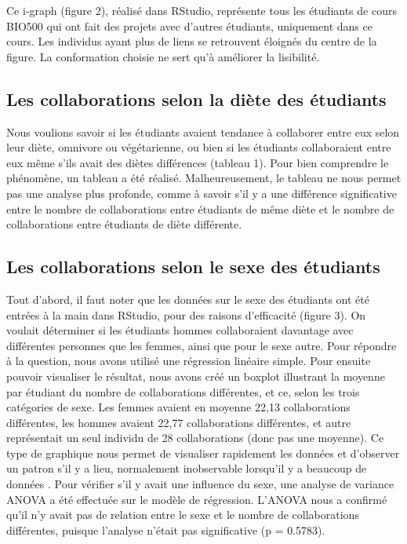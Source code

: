 \documentclass[twoside,twocolumn]{article}
\begin{document}
Ce i-graph (figure 2), réalisé dans RStudio, représente tous les étudiants de cours BIO500 qui ont fait des projets avec d’autres étudiants, uniquement dans ce cours. Les individus ayant plus de liens se retrouvent éloignés du centre de la figure. La conformation choisie ne sert qu’à améliorer la lisibilité.


\subsection{Les collaborations selon la diète des étudiants}

Nous voulions savoir si les étudiants avaient tendance à collaborer entre eux selon leur diète, omnivore ou végétarienne, ou bien si les étudiants collaboraient entre eux même s’ils avait des diètes différences (tableau 1). Pour bien comprendre le phénomène, un tableau a été réalisé. Malheureusement, le tableau ne nous permet pas une analyse plus profonde, comme à savoir s’il y a une différence significative entre le nombre de collaborations entre étudiants de même diète et le nombre de collaborations entre étudiants de diète différente.


\subsection{Les collaborations selon le sexe des étudiants}

Tout d’abord, il faut noter que les données sur le sexe des étudiants ont été entrées à la main dans RStudio, pour des raisons d’efficacité (figure 3). On voulait déterminer si les étudiants hommes collaboraient davantage avec différentes personnes que les femmes, ainsi que pour le sexe autre. Pour répondre à la question, nous avons utilisé une régression linéaire simple. Pour ensuite pouvoir visualiser le résultat, nous avons créé un boxplot illustrant la moyenne par étudiant du nombre de collaborations différentes, et ce, selon les trois catégories de sexe. Les femmes avaient en moyenne 22,13 collaborations différentes, les hommes avaient 22,77 collaborations différentes, et autre représentait un seul individu de 28 collaborations (donc pas une moyenne). Ce type de graphique nous permet de visualiser rapidement les données et d’observer un patron s’il y a lieu, normalement inobservable lorsqu’il y a beaucoup de données  \citep{williamson1989box}. Pour vérifier s’il y avait une influence du sexe, une analyse de variance ANOVA a été effectuée sur le modèle de régression. L’ANOVA nous a confirmé qu’il n’y avait pas de relation entre le sexe et le nombre de collaborations différentes, puisque l’analyse n’était pas significative (p = 0.5783).
\end{document}
